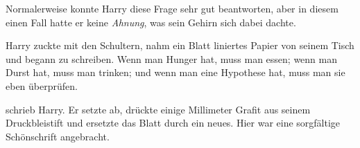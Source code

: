 Normalerweise konnte Harry diese Frage sehr gut beantworten, aber in diesem einen Fall hatte er keine \emph{Ahnung}, was sein Gehirn sich dabei dachte.


Harry zuckte mit den Schultern, nahm ein Blatt liniertes Papier von seinem Tisch und begann zu schreiben. Wenn man Hunger hat, muss man essen; wenn man Durst hat, muss man trinken; und wenn man eine Hypothese hat, muss man sie eben überprüfen.

\begin{writtenNote}
\end{writtenNote}

\noindent schrieb Harry. Er setzte ab, drückte einige Millimeter Grafit aus seinem Druckbleistift und ersetzte das Blatt durch ein neues. Hier war eine sorgfältige Schönschrift angebracht.

